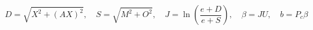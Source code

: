 \[
D = \sqrt{X^2 + (AX)^2},\quad S = \sqrt{M^2 + O^2},\quad J = \ln\left(\frac{e+D}{e+S}\right),\quad \beta = JU,\quad b = P_c\beta
\]
